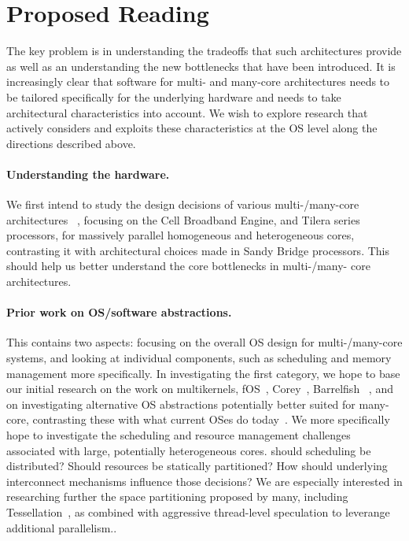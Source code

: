 \section{Proposed Reading}
\label{sec:reading}

The key problem is in understanding the tradeoffs that such architectures
provide as well as an understanding the new bottlenecks that have been introduced. It is
increasingly clear that software for multi- and many-core architectures needs to be tailored
specifically for the underlying hardware and needs to take architectural characteristics
into account. We wish to explore research that actively considers and exploits these
characteristics at the OS level along the directions described above.

\paragraph{Understanding the hardware.}
We first intend to study the design decisions of various multi-/many-core
architectures ~\cite{Re:12,KTJR:05,BRUL:05,Va:11}, focusing on the Cell Broadband Engine, and Tilera series
processors, for massively parallel homogeneous and heterogeneous cores,
contrasting it with architectural choices made in Sandy Bridge processors.
This should help us better understand the core bottlenecks in multi-/many-
core architectures.

\paragraph{Prior work on OS/software abstractions.}
This contains two aspects: focusing on the overall OS design for multi-/many-core
systems, and looking 
at individual components, such as scheduling and memory management more
specifically. In investigating the first category, we hope to
base our initial research on the work on multikernels, fOS~\cite{WC:10}, Corey~\cite{BW08},
 Barrelfish ~\cite{SPBRBHI:08,BBDHIPRSS:09},
and on investigating alternative OS abstractions potentially better suited for many-core, 
contrasting these with  what current OSes do today~\cite{BW:10}.
  We more specifically hope to investigate
the scheduling and resource management challenges associated with large, potentially heterogeneous cores.
should scheduling be distributed? Should resources be statically partitioned? How should underlying interconnect mechanisms influence those decisions? 
We are especially interested in researching further the space partitioning
proposed by many, including Tessellation~\cite{LKBHAK:09}, as combined with aggressive thread-level speculation to leverange additional parallelism..

